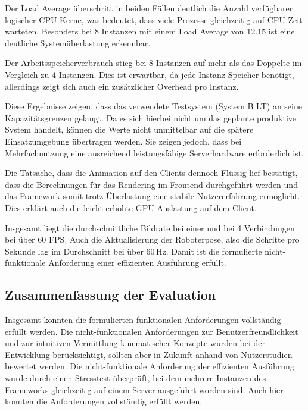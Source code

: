 Der Load Average überschritt in beiden Fällen deutlich die Anzahl verfügbarer logischer CPU-Kerne,
was bedeutet, dass viele Prozesse gleichzeitig auf CPU-Zeit warteten.
Besonders bei 8 Instanzen mit einem Load Average von 12.15 ist eine deutliche Systemüberlastung erkennbar.

Der Arbeitsspeicherverbrauch stieg bei 8 Instanzen auf mehr als das Doppelte im Vergleich zu 4 Instanzen.
Dies ist erwartbar, da jede Instanz Speicher benötigt, allerdings zeigt sich auch ein zusätzlicher Overhead pro Instanz.

Diese Ergebnisse zeigen, dass das verwendete Testsystem (System B LT) an seine Kapazitätsgrenzen gelangt.
Da es sich hierbei nicht um das geplante produktive System handelt,
können die Werte nicht unmittelbar auf die spätere Einsatzumgebung übertragen werden.
Sie zeigen jedoch, dass bei Mehrfachnutzung eine ausreichend leistungsfähige Serverhardware erforderlich ist.

Die Tatsache, dass die Animation auf den Clients dennoch Flüssig lief bestätigt, dass die Berechnungen für das
Rendering im Frontend durchgeführt werden und das Framework somit trotz Überlastung eine stabile Nutzererfahrung ermöglicht.
Dies erklärt auch die leicht erhöhte GPU Auslastung auf dem Client.

Insgesamt liegt die durchschnittliche Bildrate bei einer und bei 4 Verbindungen bei über 60 FPS.
Auch die Aktualisierung der Roboterpose, also die Schritte pro Sekunde lag im Durchschnitt bei über 60\,Hz.
Damit ist die formulierte nicht-funktionale Anforderung einer effizienten Ausführung erfüllt. 




\subsection{Zusammenfassung der Evaluation}
Insgesamt konnten die formulierten funktionalen Anforderungen vollständig erfüllt werden.
Die nicht-funktionalen Anforderungen zur Benutzerfreundlichkeit und zur intuitiven Vermittlung kinematischer Konzepte
wurden bei der Entwicklung berücksichtigt, sollten aber in Zukunft anhand von Nutzerstudien bewertet werden.
Die nicht-funktionale Anforderung der effizienten Ausführung wurde durch einen Stresstest überprüft,
bei dem mehrere Instanzen des Frameworks gleichzeitig auf einem Server ausgeführt worden sind.
Auch hier konnten die Anforderungen vollständig erfüllt werden.